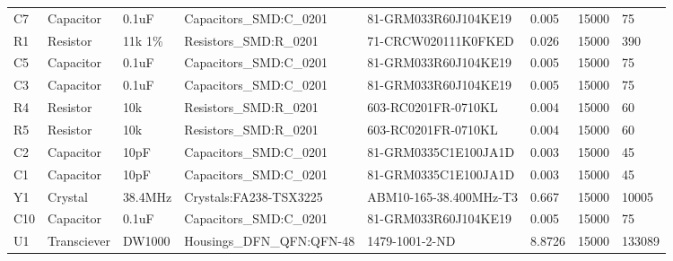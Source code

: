 \begin{landscape}
\begin{table}[]
\begin{tabular}{llllllll}
C7             & Capacitor     & 0.1uF                      & Capacitors\_SMD:C\_0201         & 81-GRM033R60J104KE19                 & 0.005                & 15000           & 75                   \\
R1             & Resistor      & 11k 1\%                    & Resistors\_SMD:R\_0201          & 71-CRCW020111K0FKED                  & 0.026                & 15000           & 390                  \\
C5             & Capacitor     & 0.1uF                      & Capacitors\_SMD:C\_0201         & 81-GRM033R60J104KE19                 & 0.005                & 15000           & 75                   \\
C3             & Capacitor     & 0.1uF                      & Capacitors\_SMD:C\_0201         & 81-GRM033R60J104KE19                 & 0.005                & 15000           & 75                   \\
R4             & Resistor      & 10k                        & Resistors\_SMD:R\_0201          & 603-RC0201FR-0710KL                  & 0.004                & 15000           & 60                   \\
R5             & Resistor      & 10k                        & Resistors\_SMD:R\_0201          & 603-RC0201FR-0710KL                  & 0.004                & 15000           & 60                   \\
C2             & Capacitor     & 10pF                       & Capacitors\_SMD:C\_0201         & 81-GRM0335C1E100JA1D                 & 0.003                & 15000           & 45                   \\
C1             & Capacitor     & 10pF                       & Capacitors\_SMD:C\_0201         & 81-GRM0335C1E100JA1D                 & 0.003                & 15000           & 45                   \\
Y1             & Crystal       & 38.4MHz                    & Crystals:FA238-TSX3225          & ABM10-165-38.400MHz-T3               & 0.667                & 15000           & 10005                \\
C10            & Capacitor     & 0.1uF                      & Capacitors\_SMD:C\_0201         & 81-GRM033R60J104KE19                 & 0.005                & 15000           & 75                   \\
U1             & Transciever   & DW1000                     & Housings\_DFN\_QFN:QFN-48       & 1479-1001-2-ND                       & 8.8726               & 15000           & 133089               \\

\end{tabular}
\end{table}
\end{landscape}
